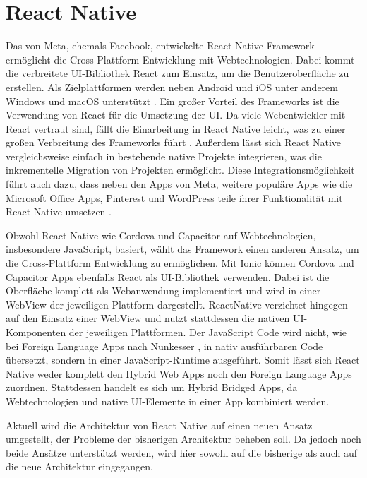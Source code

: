 \section{React Native}
\label{sec:Frameorks_ReactNative}

Das von Meta, ehemals Facebook, entwickelte React Native Framework ermöglicht die Cross-Plattform Entwicklung mit Webtechnologien.
Dabei kommt die verbreitete \ac{UI}-Bibliothek React zum Einsatz, um die Benutzeroberfläche zu erstellen.
Als Zielplattformen werden neben Android und iOS unter anderem Windows und macOS unterstützt \cite{ReactNative}.
Ein großer Vorteil des Frameworks ist die Verwendung von React für die Umsetzung der \ac{UI}.
Da viele Webentwickler mit React vertraut sind, fällt die Einarbeitung in React Native leicht, was zu einer großen Verbreitung des Frameworks führt \cite{Appfigures_TopSDKs,Stackoverflow_2022}.
Außerdem lässt sich React Native vergleichsweise einfach in bestehende native Projekte integrieren, was die inkrementelle Migration von Projekten ermöglicht.
Diese Integrationsmöglichkeit führt auch dazu, dass neben den Apps von Meta, weitere populäre Apps wie die Microsoft Office Apps, Pinterest und WordPress teile ihrer Funktionalität mit React Native umsetzen \cite{ReactNative_Showcase}.


Obwohl React Native wie Cordova und Capacitor auf Webtechnologien, insbesondere JavaScript, basiert, wählt das Framework einen anderen Ansatz, um die Cross-Plattform Entwicklung zu ermöglichen.
Mit Ionic können Cordova und Capacitor Apps ebenfalls React als \ac{UI}-Bibliothek verwenden.
Dabei ist die Oberfläche komplett als Webanwendung implementiert und wird in einer WebView der jeweiligen Plattform dargestellt.
ReactNative verzichtet hingegen auf den Einsatz einer WebView und nutzt stattdessen die nativen \ac{UI}-Komponenten der jeweiligen Plattformen.
Der JavaScript Code wird nicht, wie bei Foreign Language Apps nach Nunkesser \cite{Nunkesser_Taxonomy_Apps}, in nativ ausführbaren Code übersetzt, sondern in einer JavaScript-Runtime ausgeführt.
Somit lässt sich  React Native weder komplett den Hybrid Web Apps noch den Foreign Language Apps zuordnen.
Stattdessen handelt es sich um Hybrid Bridged Apps, da Webtechnologien und native \ac{UI}-Elemente in einer App kombiniert werden.


Aktuell wird die Architektur von React Native auf einen neuen Ansatz umgestellt, der Probleme der bisherigen Architektur beheben soll.
Da jedoch noch beide Ansätze unterstützt werden, wird hier sowohl auf die bisherige als auch auf die neue Architektur eingegangen.


